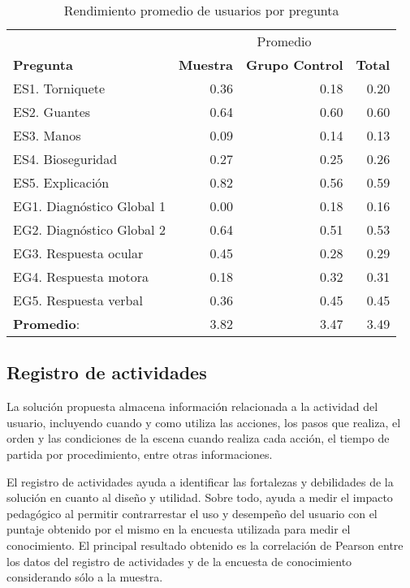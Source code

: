 \begin{table}
\centering
\caption{Rendimiento promedio de usuarios por pregunta}
\begin{tabular}{lrrr}
\toprule
& \multicolumn{3}{c}{Promedio} \\
\cmidrule(lr){2-4}
\textbf{Pregunta} & 
\textbf{Muestra} & 
\textbf{Grupo Control} & 
\textbf{Total} \\ 
\midrule
ES1. Torniquete           & 0.36 & 0.18 & 0.20 \\
ES2. Guantes              & 0.64 & 0.60 & 0.60 \\
ES3. Manos                & 0.09 & 0.14 & 0.13 \\
ES4. Bioseguridad         & 0.27 & 0.25 & 0.26 \\
ES5. Explicación          & 0.82 & 0.56 & 0.59 \\
\midrule
EG1. Diagnóstico Global 1 & 0.00 & 0.18 & 0.16 \\
EG2. Diagnóstico Global 2 & 0.64 & 0.51 & 0.53 \\
EG3. Respuesta ocular     & 0.45 & 0.28 & 0.29 \\
EG4. Respuesta motora     & 0.18 & 0.32 & 0.31 \\
EG5. Respuesta verbal     & 0.36 & 0.45 & 0.45 \\
\midrule
\textbf{Promedio}: & 3.82 & 3.47 & 3.49  \\
\bottomrule
\end{tabular}

\label{tab:objetiva_rendimiento_por_pregunta}
\end{table}

\subsection{Registro de actividades}

La solución propuesta almacena información relacionada a la actividad del
usuario, incluyendo cuando y como utiliza las acciones, los pasos que realiza,
el orden y las condiciones de la escena cuando realiza cada acción, el tiempo de partida por procedimiento, entre otras informaciones.

El registro de actividades ayuda a identificar las  fortalezas y debilidades de
la solución en cuanto al diseño y utilidad. Sobre todo, ayuda a medir el impacto
pedagógico al permitir contrarrestar el uso y desempeño del usuario con el
puntaje obtenido por el mismo en la encuesta utilizada para medir el
conocimiento. El principal resultado obtenido es la correlación de 
Pearson\cite{BoslaughStatistics2008} entre los datos del registro de actividades y de la encuesta de conocimiento considerando sólo a la muestra.

